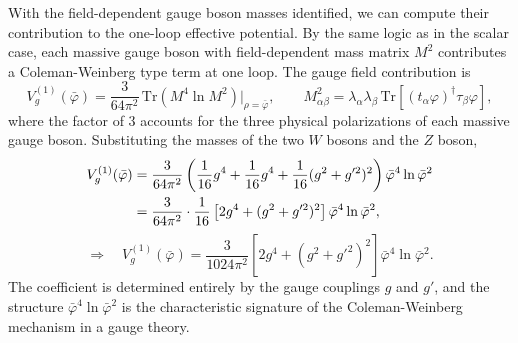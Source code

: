 With the field-dependent gauge boson masses identified, we can compute
their contribution to the one-loop effective potential. By the same logic
as in the scalar case, each massive gauge boson with field-dependent mass
matrix $M^2$ contributes a Coleman-Weinberg type term at one loop. The
gauge field contribution is
\begin{equation}
	V_g^{(1)}(\bar\varphi) = \frac{3}{64\pi^2}
	\,\mathrm{Tr}\!\left(M^4\ln M^2\right)\Big|_{\rho=\bar\varphi},
	\qquad
	M^2_{\alpha\beta} = \lambda_\alpha\lambda_\beta\,
	\mathrm{Tr}\!\left[(t_\alpha\varphi)^\dagger\tau_\beta\varphi\right],
\end{equation}
where the factor of 3 accounts for the three physical polarizations of
each massive gauge boson. Substituting the masses of the two $W$ bosons
and the $Z$ boson,
\begin{align}
	V_g^{(1)}(\bar\varphi)
	 & = \frac{3}{64\pi^2}\left(\frac{1}{16}g^4
	+ \frac{1}{16}g^4
	+ \frac{1}{16}(g^2+g'^2)^2\right)
	\bar\varphi^4\ln\bar\varphi^2 \notag        \\
	 & = \frac{3}{64\pi^2}\cdot\frac{1}{16}
	\left[2g^4+(g^2+g'^2)^2\right]
	\bar\varphi^4\ln\bar\varphi^2,
\end{align}
\begin{equation}
	\boxed{\Rightarrow\quad V_g^{(1)}(\bar\varphi)
		= \frac{3}{1024\pi^2}\left[2g^4+(g^2+g'^2)^2\right]
		\bar\varphi^4\ln\bar\varphi^2.}
\end{equation}
The coefficient is determined entirely by the gauge couplings $g$ and
$g'$, and the structure $\bar\varphi^4\ln\bar\varphi^2$ is the
characteristic signature of the Coleman-Weinberg mechanism in a gauge
theory.


